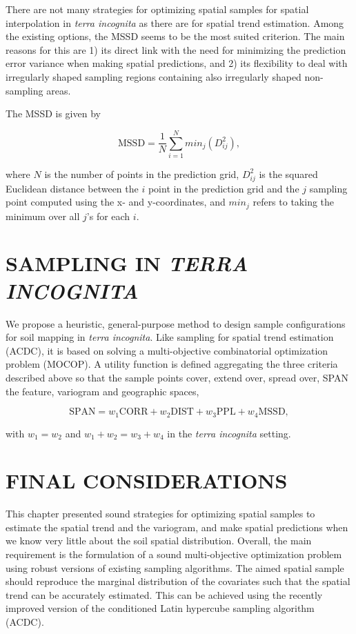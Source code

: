 There are not many strategies for optimizing spatial samples for spatial interpolation in \emph{terra 
incognita} as there are for spatial trend estimation. Among the existing options, the MSSD seems to be the most 
suited criterion. The main reasons for this are 1) its direct link with the need for minimizing the prediction 
error variance when making spatial predictions, and 2) its flexibility to deal with irregularly shaped sampling 
regions containing also irregularly shaped non-sampling areas.

The MSSD is given by

\begin{equation}%
 \text{MSSD} = \frac{1}{N} \sum_{i = 1}^{N} min_j(D_{ij}^2),
\end{equation}

\noindent where $N$ is the number of points in the prediction grid, $D_{ij}^2$ is the squared Euclidean 
distance between the $i$ point in the prediction grid and the $j$ sampling point computed using the x- and 
y-coordinates, and $min_j$ refers to taking the minimum over all $j$’s for each $i$.

\section{SAMPLING IN \emph{TERRA INCOGNITA}}

We propose a heuristic, general-purpose method to design sample configurations for soil mapping in \emph{terra 
incognita}. Like sampling for spatial trend estimation (ACDC), it is based on solving a multi-objective 
combinatorial optimization problem (MOCOP). A utility function is defined aggregating the three criteria 
described above so that the sample points cover, extend over, spread over, SPAN the feature, variogram 
and geographic spaces,

\begin{equation} %
\text{SPAN} = w_1 \text{CORR} + w_2 \text{DIST} + w_3 \text{PPL} + w_4 \text{MSSD}, 
\end{equation}\label{eqn:chap08-span}

with $w_1 = w_2$ and $w_1 + w_2 = w_3 + w_4$ in the \emph{terra incognita} setting.

\section{FINAL CONSIDERATIONS}

This chapter presented sound strategies for optimizing spatial samples to estimate the spatial trend and the 
variogram, and make spatial predictions when we know very little about the soil spatial distribution. Overall, 
the main requirement is the formulation of a sound multi-objective optimization problem using robust versions 
of existing sampling algorithms. The aimed spatial sample should reproduce the marginal distribution of the 
covariates such that the spatial trend can be accurately estimated. This can be achieved using the recently 
improved version of the conditioned Latin hypercube sampling algorithm (ACDC).

